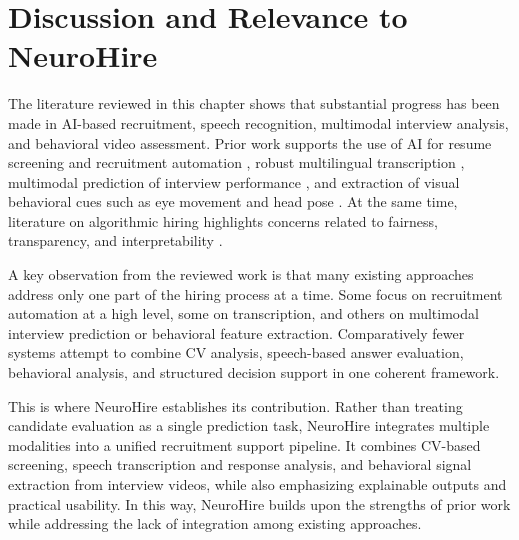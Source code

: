 \section{Discussion and Relevance to NeuroHire}
The literature reviewed in this chapter shows that substantial progress has been made in AI-based recruitment, speech recognition, multimodal interview analysis, and behavioral video assessment. Prior work supports the use of AI for resume screening and recruitment automation \cite{rathore_ai_recruitment,sha_ri_ai_recruitment}, robust multilingual transcription \cite{radford2022whisper}, multimodal prediction of interview performance \cite{naim2015jobinterview,nguyen2013bodycommunication,zhang2025avi}, and extraction of visual behavioral cues such as eye movement and head pose \cite{pimplaskar2013eye,huttunen_headpose}. At the same time, literature on algorithmic hiring highlights concerns related to fairness, transparency, and interpretability \cite{raghavan2020bias}.

A key observation from the reviewed work is that many existing approaches address only one part of the hiring process at a time. Some focus on recruitment automation at a high level, some on transcription, and others on multimodal interview prediction or behavioral feature extraction. Comparatively fewer systems attempt to combine CV analysis, speech-based answer evaluation, behavioral analysis, and structured decision support in one coherent framework.

This is where NeuroHire establishes its contribution. Rather than treating candidate evaluation as a single prediction task, NeuroHire integrates multiple modalities into a unified recruitment support pipeline. It combines CV-based screening, speech transcription and response analysis, and behavioral signal extraction from interview videos, while also emphasizing explainable outputs and practical usability. In this way, NeuroHire builds upon the strengths of prior work while addressing the lack of integration among existing approaches.

